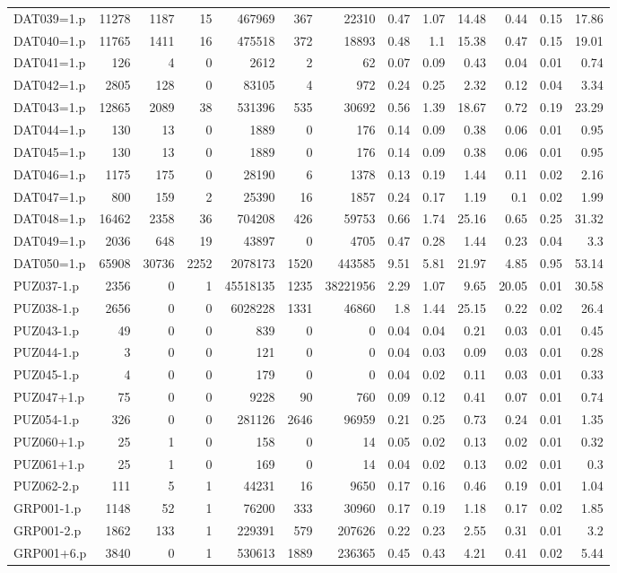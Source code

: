 \begin{table}[H]
\begin{adjustwidth}{-1.1in}{-0.5in}
\begin{tabular}{| l || r | r | r || r | r | r || r | r | r | r | r | r |}
DAT039=1.p&11278&1187&15&467969&367&22310&0.47&1.07&14.48&0.44&0.15&17.86\\
DAT040=1.p&11765&1411&16&475518&372&18893&0.48&1.1&15.38&0.47&0.15&19.01\\
DAT041=1.p&126&4&0&2612&2&62&0.07&0.09&0.43&0.04&0.01&0.74\\
DAT042=1.p&2805&128&0&83105&4&972&0.24&0.25&2.32&0.12&0.04&3.34\\
DAT043=1.p&12865&2089&38&531396&535&30692&0.56&1.39&18.67&0.72&0.19&23.29\\
DAT044=1.p&130&13&0&1889&0&176&0.14&0.09&0.38&0.06&0.01&0.95\\
DAT045=1.p&130&13&0&1889&0&176&0.14&0.09&0.38&0.06&0.01&0.95\\
DAT046=1.p&1175&175&0&28190&6&1378&0.13&0.19&1.44&0.11&0.02&2.16\\
DAT047=1.p&800&159&2&25390&16&1857&0.24&0.17&1.19&0.1&0.02&1.99\\
DAT048=1.p&16462&2358&36&704208&426&59753&0.66&1.74&25.16&0.65&0.25&31.32\\
DAT049=1.p&2036&648&19&43897&0&4705&0.47&0.28&1.44&0.23&0.04&3.3\\
DAT050=1.p&65908&30736&2252&2078173&1520&443585&9.51&5.81&21.97&4.85&0.95&53.14\\
PUZ037-1.p&2356&0&1&45518135&1235&38221956&2.29&1.07&9.65&20.05&0.01&30.58\\
PUZ038-1.p&2656&0&0&6028228&1331&46860&1.8&1.44&25.15&0.22&0.02&26.4\\
PUZ043-1.p&49&0&0&839&0&0&0.04&0.04&0.21&0.03&0.01&0.45\\
PUZ044-1.p&3&0&0&121&0&0&0.04&0.03&0.09&0.03&0.01&0.28\\
PUZ045-1.p&4&0&0&179&0&0&0.04&0.02&0.11&0.03&0.01&0.33\\
PUZ047+1.p&75&0&0&9228&90&760&0.09&0.12&0.41&0.07&0.01&0.74\\
PUZ054-1.p&326&0&0&281126&2646&96959&0.21&0.25&0.73&0.24&0.01&1.35\\
PUZ060+1.p&25&1&0&158&0&14&0.05&0.02&0.13&0.02&0.01&0.32\\
PUZ061+1.p&25&1&0&169&0&14&0.04&0.02&0.13&0.02&0.01&0.3\\
PUZ062-2.p&111&5&1&44231&16&9650&0.17&0.16&0.46&0.19&0.01&1.04\\
GRP001-1.p&1148&52&1&76200&333&30960&0.17&0.19&1.18&0.17&0.02&1.85\\
GRP001-2.p&1862&133&1&229391&579&207626&0.22&0.23&2.55&0.31&0.01&3.2\\
GRP001+6.p&3840&0&1&530613&1889&236365&0.45&0.43&4.21&0.41&0.02&5.44\\

\end{tabular}
\end{adjustwidth}
\end{table}
